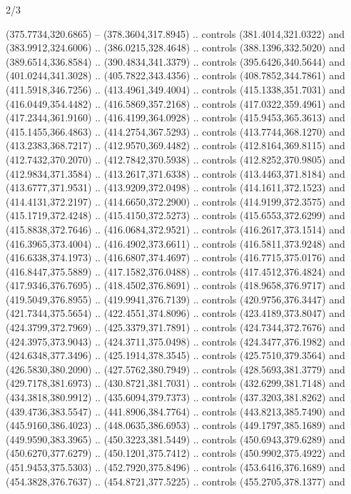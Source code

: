 \begin{flagdescription}{2/3}
\begin{scope}[xshift=0.5\flaglength,yshift=0.5\flagwidth,scale=\flagwidth/562]
\begin{scope}[y=1pt, x=1pt, yscale=-1,shift={(-421.88,-281.25)}]
  (375.7734,320.6865) -- (378.3604,317.8945) .. controls (381.4014,321.0322) and
  (383.9912,324.6006) .. (386.0215,328.4648) .. controls (388.1396,332.5020) and
  (389.6514,336.8584) .. (390.4834,341.3379) .. controls (395.6426,340.5644) and
  (401.0244,341.3028) .. (405.7822,343.4356) .. controls (408.7852,344.7861) and
  (411.5918,346.7256) .. (413.4961,349.4004) .. controls (415.1338,351.7031) and
  (416.0449,354.4482) .. (416.5869,357.2168) .. controls (417.0322,359.4961) and
  (417.2344,361.9160) .. (416.4199,364.0928) .. controls (415.9453,365.3613) and
  (415.1455,366.4863) .. (414.2754,367.5293) .. controls (413.7744,368.1270) and
  (413.2383,368.7217) .. (412.9570,369.4482) .. controls (412.8164,369.8115) and
  (412.7432,370.2070) .. (412.7842,370.5938) .. controls (412.8252,370.9805) and
  (412.9834,371.3584) .. (413.2617,371.6338) .. controls (413.4463,371.8184) and
  (413.6777,371.9531) .. (413.9209,372.0498) .. controls (414.1611,372.1523) and
  (414.4131,372.2197) .. (414.6650,372.2900) .. controls (414.9199,372.3575) and
  (415.1719,372.4248) .. (415.4150,372.5273) .. controls (415.6553,372.6299) and
  (415.8838,372.7646) .. (416.0684,372.9521) .. controls (416.2617,373.1514) and
  (416.3965,373.4004) .. (416.4902,373.6611) .. controls (416.5811,373.9248) and
  (416.6338,374.1973) .. (416.6807,374.4697) .. controls (416.7715,375.0176) and
  (416.8447,375.5889) .. (417.1582,376.0488) .. controls (417.4512,376.4824) and
  (417.9346,376.7695) .. (418.4502,376.8691) .. controls (418.9658,376.9717) and
  (419.5049,376.8955) .. (419.9941,376.7139) .. controls (420.9756,376.3447) and
  (421.7344,375.5654) .. (422.4551,374.8096) .. controls (423.4189,373.8047) and
  (424.3799,372.7969) .. (425.3379,371.7891) .. controls (424.7344,372.7676) and
  (424.3975,373.9043) .. (424.3711,375.0498) .. controls (424.3477,376.1982) and
  (424.6348,377.3496) .. (425.1914,378.3545) .. controls (425.7510,379.3564) and
  (426.5830,380.2090) .. (427.5762,380.7949) .. controls (428.5693,381.3779) and
  (429.7178,381.6973) .. (430.8721,381.7031) .. controls (432.6299,381.7148) and
  (434.3818,380.9912) .. (435.6094,379.7373) .. controls (437.3203,381.8262) and
  (439.4736,383.5547) .. (441.8906,384.7764) .. controls (443.8213,385.7490) and
  (445.9160,386.4023) .. (448.0635,386.6953) .. controls (449.1797,385.1689) and
  (449.9590,383.3965) .. (450.3223,381.5449) .. controls (450.6943,379.6289) and
  (450.6270,377.6279) .. (450.1201,375.7412) .. controls (450.9902,375.4922) and
  (451.9453,375.5303) .. (452.7920,375.8496) .. controls (453.6416,376.1689) and
  (454.3828,376.7637) .. (454.8721,377.5225) .. controls (455.2705,378.1377) and

\end{scope}
\end{scope}
\end{flagdescription}
